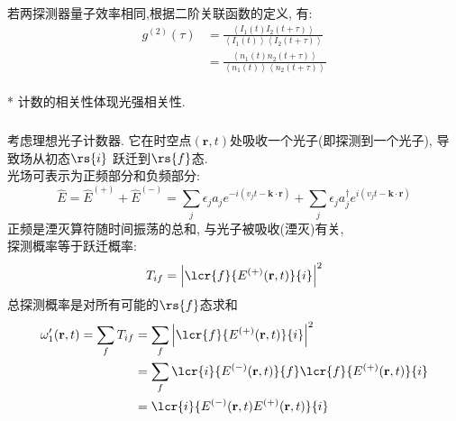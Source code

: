 
 \begin{frame}  
  \frametitle{}
      若两探测器量子效率相同,根据二阶关联函数的定义, 有:
      \[ \begin{aligned}
        g^{(2)}(\tau) &= \frac{\left\langle I_1 (t)  I_2 (t+ \tau)\right\rangle }{\left\langle I_1 (t) \right\rangle  \left\langle I_2 (t+ \tau)\right\rangle }\\ 
        &=  \frac{\left\langle n_1 (t)  n_2 (t+ \tau)\right\rangle}{\left\langle n_1 (t)\right\rangle \left\langle n_2 (t+ \tau)\right\rangle}
    \end{aligned}\] 
    ~\\ {\vspace*{2.3em}} 
    * 计数的相关性体现光强相关性.
 \end{frame}

 \begin{frame} 
  \frametitle{}
       {\Bullet}考虑理想光子计数器. 它在时空点$(\mathbf{r}, t)$处吸收一个光子(即探测到一个光子), 导致场从初态$\rs{i }$ 跃迁到$\rs{f}$态. \\
       光场可表示为正频部分和负频部分:
       \[ \hat{E} = \hat{E}^{(+)} + \hat{E}^{(-)} =\sum_j \epsilon_j a_j e^{-i(v_j t - \mathbf{k}\cdot \mathbf{r})} + \sum_j \epsilon_j a^{\dagger} _j e^{i(v_j t - \mathbf{k}\cdot \mathbf{r})}\]
       正频是湮灭算符随时间振荡的总和, 与光子被吸收(湮灭)有关,\\ 
       探测概率等于跃迁概率:
       \[T_{if} = \left| \lcr{f}{E^{(+)}(\mathbf{r}, t)}{i} \right|^2\] 
       总探测概率是对所有可能的$\rs{f}$态求和
       \[ \begin{aligned}
           \omega'_1(\mathbf{r}, t) = \sum_f T_{if} &= \sum_f \left| \lcr{f}{E^{(+)}(\mathbf{r}, t)}{i} \right|^2 \\ 
           &= \sum_f \lcr{i}{E^{(-)}(\mathbf{r}, t)}{f} \lcr{f}{E^{(+)}(\mathbf{r}, t)}{i}   \\
           &= \lcr{i}{E^{(-)}(\mathbf{r}, t)E^{(+)}(\mathbf{r}, t)}{i}  
       \end{aligned}\] 
 \end{frame}

